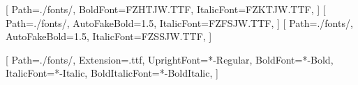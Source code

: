 \renewcommand{\headrulewidth}{0pt} %

\cfoot{\thepage\ / \pageref*{LastPage}} %


\fancypagestyle{plain}{
    \fancyhf{} %
    \renewcommand{\headrulewidth}{0pt} %
    \cfoot{\thepage\ / \pageref*{LastPage}} %
}


\usepackage[T1]{fontenc} %
\usepackage{anyfontsize}
\usepackage{libertine} %

[ %
    Path=./fonts/,
    BoldFont=FZHTJW.TTF, %
    ItalicFont=FZKTJW.TTF, %
]
[ %
    Path=./fonts/,
    AutoFakeBold=1.5,  %
    ItalicFont=FZFSJW.TTF, %
]
[ %
    Path=./fonts/,
    AutoFakeBold=1.5,  %
    ItalicFont=FZSSJW.TTF, %
] 

\setmonofont{MapleMono-NF-CN}[ %
    Path=./fonts/, %
    Extension=.ttf, %
    UprightFont=*-Regular, %
    BoldFont=*-Bold, %
    ItalicFont=*-Italic, %
    BoldItalicFont=*-BoldItalic, %
]


\usepackage{annotate-equations} %


\newcommand{\annotatevspace}[1]{\par\vspace{#1}\noindent} %

